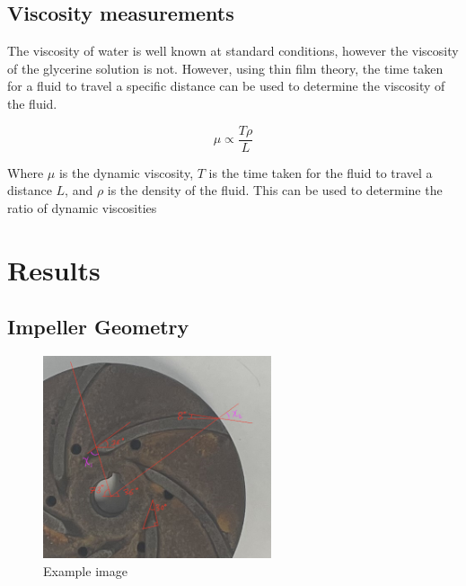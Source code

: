 \documentclass{article}
\begin{document}
\subsection{Viscosity measurements}

The viscosity of water is well known at standard conditions, however the viscosity of the glycerine solution is not.
However, using thin film theory, the time taken for a fluid to travel a specific distance can be used to determine the viscosity of the fluid.

\begin{equation}
    \mu \propto \frac{T\rho}{L}
\end{equation}
    
Where $\mu$ is the dynamic viscosity, $T$ is the time taken for the fluid to travel a distance $L$, and $\rho$ is the density of the fluid.
This can be used to determine the ratio of dynamic viscosities


\section{Results}


\subsection{Impeller Geometry}

\begin{figure}[H]
    \centering
    \includegraphics[width=0.6\textwidth]{impeller_annotations.png}
    \caption{Example image}
    \label{fig:impeller_annotations}
\end{figure}
\end{document}

